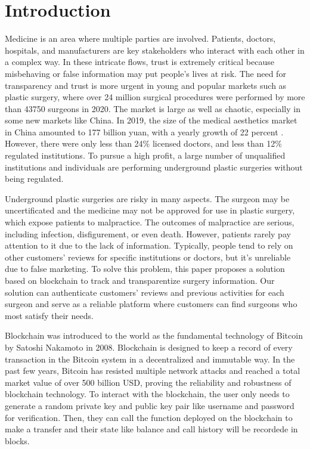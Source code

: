 \documentclass{article}
\begin{document}
\section{Introduction}
Medicine is an area where multiple parties are involved. Patients, doctors, hospitals, and manufacturers are key stakeholders who interact with each other in a complex way. In these intricate flows, trust is extremely critical because misbehaving or false information may put people's lives at risk. The need for transparency and trust is more urgent in young and popular markets such as plastic surgery, where over 24 million surgical procedures were performed by more than 43750 surgeons in 2020\cite{ISAPS}. The market is large as well as chaotic, especially in some new markets like China. In 2019, the size of the medical aesthetics market in China amounted to 177 billion yuan, with a yearly growth of 22 percent \cite{ChinaMarket}. However, there were only less than 24\% licensed doctors, and less than 12\% regulated institutions\cite{ChinaReport}. To pursue a high profit, a large number of unqualified institutions and individuals are performing underground plastic surgeries without being regulated.
\par Underground plastic surgeries are risky in many aspects. The surgeon may be uncertificated and the medicine may not be approved for use in plastic surgery, which expose patients to malpractice. The outcomes of malpractice are serious, including infection, disfigurement, or even death. However, patients rarely pay attention to it due to the lack of information. Typically, people tend to rely on other customers' reviews for specific institutions or doctors, but it's unreliable due to false marketing. To solve this problem, this paper proposes a solution based on blockchain to track and transparentize surgery information. Our solution can authenticate customers' reviews and  previous activities for each surgeon and serve as a reliable platform where customers can find surgeons who most satisfy their needs.  
\par Blockchain was introduced to the world as the fundamental technology of Bitcoin by Satoshi Nakamoto in 2008\cite{Bitcoin}. Blockchain is designed to keep a record of every transaction in the Bitcoin system in a decentralized and immutable way. In the past few years, Bitcoin has resisted multiple network attacks and reached a total market value of over 500 billion USD, proving the reliability and robustness of blockchain technology. To interact with the blockchain, the user only needs to generate a random private key and public key pair like username and password for verification. Then, they can call the function deployed on the blockchain to make a transfer and their state like balance and call history will be recordede in blocks.
\end{document}
